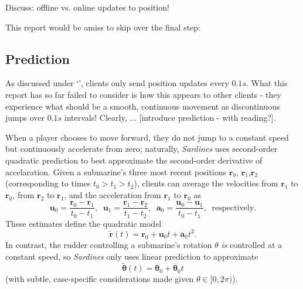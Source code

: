 \documentclass[a4paper, 9pt]{article}
\begin{document}
\begin{flushleft}
\vspace{5pt}\noindent
Discuss: offline vs. online updates to position!

\vspace{5pt}\noindent
This report would be amiss to skip over the final step: 

\subsection*{Prediction}\label{Prediction}

As discussed under `',  clients only send position updates every $0.1s$. What this report has so far failed to consider is how this appears to other clients - they experience what should be a smooth, continuous movement as discontinuous jumps over $0.1s$ intervals! Clearly, ... [introduce prediction - with reading?].

\vspace{5pt}\noindent
When a player chooses to move forward, they do not jump to a constant speed but continuously accelerate from zero; naturally, \textit{Sardines} uses second-order quadratic prediction to best approximate the second-order derivative of accelaration. Given a submarine's three most recent positions $\mathbf{r}_0$, $\mathbf{r}_1$,$\mathbf{r}_2$ (corresponding to times $t_0 > t_1 > t_2$), clients can average the velocities from $\mathbf{r}_1$ to $\mathbf{r}_0$, from $\mathbf{r}_2$ to $\mathbf{r}_1$, and the acceleration from $\mathbf{r}_1$ to $\mathbf{r}_0$ as
$$\mathbf{u}_0 = \frac{\mathbf{r}_0-\mathbf{r}_1}{t_0-t_1}, \;\; \mathbf{u}_1 = \frac{\mathbf{r}_1-\mathbf{r}_2}{t_1-t_2}, \;\; \mathbf{a}_0 = \frac{\mathbf{u}_0-\mathbf{u}_1}{t_0-t_1}, \;\; \textrm{respectively.}$$
These estimates define the quadratic model
$$ \mathbf{\tilde{r}}(t) = \mathbf{r}_0+\mathbf{u}_0t+\mathbf{a}_0t^2.$$
In contrast, the rudder controlling a submarine's rotation $\theta$ \textit{is} controlled at a constant speed, so \textit{Sardines} only uses linear prediction to approximate
$$\mathbf{\tilde{\theta}}(t) = \mathbf{\theta}_0+\mathbf{\dot{\theta}}_0t$$
(with subtle, case-specific considerations made given $\theta \in [0,2\pi)$).



\end{flushleft}
\end{document}
